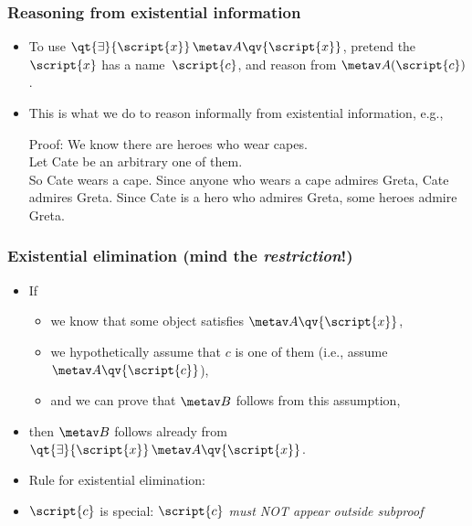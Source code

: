 \begin{frame}
  \frametitle{Reasoning from existential information}

  \begin{itemize}
    \item To use $\qt{\exists}{\script{x}}\,\metav A\qv{\script{x}}$, pretend the
    $\script{x}$ has a name~$\script{c}$, and reason from $\metav A(\script{c})$.
    \item This is what we do to reason informally from existential information, e.g.,

\pause
Proof: We know there are heroes who wear capes. \\ Let Cate be an
arbitrary one of them. \\ So Cate wears a cape. Since anyone who wears a
cape admires Greta, Cate admires Greta. Since Cate is a hero who
admires Greta, some heroes admire Greta.
\end{itemize}

\end{frame}

\begin{frame}
\frametitle{Existential elimination (mind the \emph{restriction}!)}

\begin{itemize}[<+->]
  \item If
  \begin{itemize}[<+->]
    \item we know that some object satisfies $\metav A\qv{\script{x}}$,
    \item we hypothetically assume that $c$ is one of them (i.e.,
  assume $\metav A\qv{\script{c}}$), 
    \item and we can prove that $\metav B$ follows from this assumption,
\end{itemize}
\item[] then $\metav B$ follows already from $\qt{\exists}{\script{x}}\, \metav A\qv{\script{x}}$.
\item Rule for existential elimination:

\begin{fitchproof}
  \open
   
\close
{}
\end{fitchproof}
\medskip
\item $\script{c}$ is special: $\script{c}$ \emph{must NOT appear outside subproof}
\end{itemize}
\end{frame}

